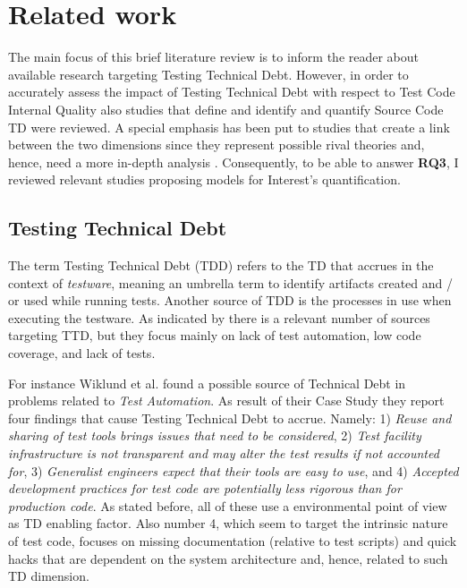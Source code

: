\chapter{Related work} \label{sec:related_work}

The main focus of this brief literature review is to inform the reader about available research targeting Testing Technical Debt. However, in order to accurately assess the impact of Testing Technical Debt with respect to Test Code Internal Quality also studies that define and identify and quantify Source Code TD \cite{mapping_study_td} were reviewed. A special emphasis has been put to studies that create a link between the two dimensions since they represent possible rival theories and, hence, need a more in-depth analysis \cite{case_study_guide}. Consequently, to be able to answer \textbf{RQ3}, I reviewed relevant studies proposing models for Interest's quantification.

\section{Testing Technical Debt} \label{testing_td}

The term Testing Technical Debt (TDD) refers to the TD that accrues in the context of \textit{testware}, meaning an umbrella term to identify artifacts created and / or used while running tests. Another source of TDD is the processes in use when executing the testware. As indicated by \cite{mapping_study_td, exploration_of_td, exploration_of_td2} there is a relevant number of sources targeting TTD, but they focus mainly on lack of test automation, low code coverage, and lack of tests.

For instance Wiklund et al. \cite{test_automation_td} found a possible source of Technical Debt in problems related to \textit{Test Automation}. As result of their Case Study they report four findings that cause Testing Technical Debt to accrue. Namely: 1) \textit{Reuse and sharing of test tools brings issues that need to be considered}, 2) \textit{Test facility infrastructure is not transparent and may alter the test results if not accounted for}, 3) \textit{Generalist engineers expect that their tools are easy to use}, and 4) \textit{Accepted development practices for test code are potentially less rigorous than for production code}. As stated before, all of these use a environmental point of view as TD enabling factor. Also number 4, which seem to target the intrinsic nature of test code, focuses on missing documentation (relative to test scripts) and quick hacks that are dependent on the system architecture and, hence, related to such TD dimension. 

